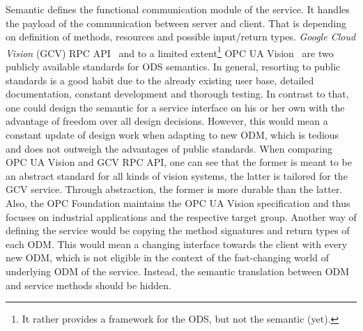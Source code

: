 \begin{table}[ht]
\begin{center}
\begin{minipage}{\textwidth}
      \end{minipage}
    \end{center}
\end{table}%


Semantic defines the functional communication module of the service. It handles the payload of the communication between server and client. That is depending on definition of methods, resources and possible input/return types. \textit{Google Cloud Vision} (GCV) RPC API~\cite{Google-Cloud-Documentation2018Cloud2018} and to a limited extent\footnote{It rather provides a framework for the ODS, but not the semantic (yet).} OPC UA Vision~\cite{VDMA2018OPCSpecification} are two publicly available standards for ODS semantics. In general, resorting to public standards is a good habit due to the already existing user base, detailed documentation, constant development and thorough testing. In contrast to that, one could design the semantic for a service interface on his or her own with the advantage of freedom over all design decisions. However, this would mean a constant update of design work when adapting to new ODM, which is tedious and does not outweigh the advantages of public standards. When comparing OPC UA Vision and GCV RPC API, one can see that the former is meant to be an abstract standard for all kinds of vision systems, the latter is tailored for the GCV service. Through abstraction, the former is more durable than the latter. Also, the OPC Foundation maintains the OPC UA Vision specification and thus focuses on industrial applications and the respective target group. Another way of defining the service would be copying the method signatures and return types of each ODM. This would mean a changing interface towards the client with every new ODM, which is not eligible in the context of the fast-changing world of underlying ODM of the service. Instead, the semantic translation between ODM and service methods should be hidden. 

